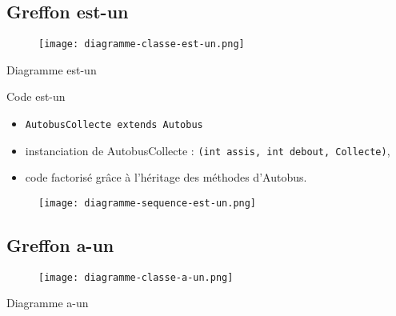 \documentclass{beamer}
\begin{document}
\subsection{Greffon est-un}
\begin{frame}
\begin{center}
\begin{figure}
\texttt{[image: diagramme-classe-est-un.png]}
\end{figure}
Diagramme est-un
\end{center}
\end{frame}

\begin{frame}
\begin{center}
\begin{block}{Code est-un}
\begin{itemize}
\item \texttt{AutobusCollecte extends Autobus}
\item instanciation de AutobusCollecte : \texttt{(int assis, int debout, Collecte)},
\item code factorisé grâce à l'héritage des méthodes d'Autobus.
\end{itemize}
\end{block}
\begin{figure}
\texttt{[image: diagramme-sequence-est-un.png]}
\end{figure}
\end{center}
\end{frame}

\subsection{Greffon a-un}
\begin{frame}
\begin{center}
\begin{figure}
\texttt{[image: diagramme-classe-a-un.png]}
\end{figure}
Diagramme a-un
\end{center}
\end{frame}
\end{document}
